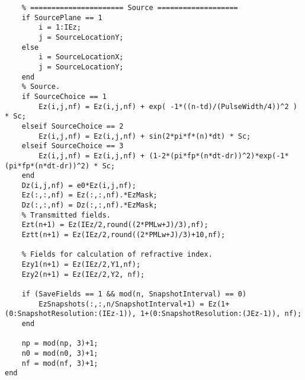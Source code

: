 \begin{lstlisting}
    % ====================== Source ===================
    if SourcePlane == 1
        i = 1:IEz;
        j = SourceLocationY;        
    else
        i = SourceLocationX;
        j = SourceLocationY;
    end
    % Source.
    if SourceChoice == 1
        Ez(i,j,nf) = Ez(i,j,nf) + exp( -1*((n-td)/(PulseWidth/4))^2 ) * Sc;
    elseif SourceChoice == 2
        Ez(i,j,nf) = Ez(i,j,nf) + sin(2*pi*f*(n)*dt) * Sc;
    elseif SourceChoice == 3
        Ez(i,j,nf) = Ez(i,j,nf) + (1-2*(pi*fp*(n*dt-dr))^2)*exp(-1*(pi*fp*(n*dt-dr))^2) * Sc;
    end
    Dz(i,j,nf) = e0*Ez(i,j,nf);
    Ez(:,:,nf) = Ez(:,:,nf).*EzMask;
    Dz(:,:,nf) = Dz(:,:,nf).*EzMask;
    % Transmitted fields.
    Ezt(n+1) = Ez(IEz/2,round((2*PMLw+J)/3),nf);
    Eztt(n+1) = Ez(IEz/2,round((2*PMLw+J)/3)+10,nf);
    
    % Fields for calculation of refractive index.
    Ezy1(n+1) = Ez(IEz/2,Y1,nf);
    Ezy2(n+1) = Ez(IEz/2,Y2, nf);
    
    if (SaveFields == 1 && mod(n, SnapshotInterval) == 0)
        EzSnapshots(:,:,n/SnapshotInterval+1) = Ez(1+(0:SnapshotResolution:(IEz-1)), 1+(0:SnapshotResolution:(JEz-1)), nf);
    end
    
    np = mod(np, 3)+1;
    n0 = mod(n0, 3)+1;
    nf = mod(nf, 3)+1;
end
\end{lstlisting}
